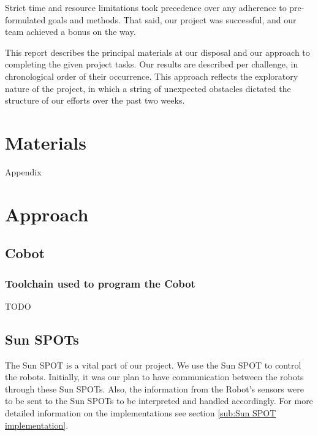 \documentclass[a4paper,10pt]{article} %
\begin{document}
Strict time and resource limitations took precedence over any adherence
to pre-formulated goals and methods. That said, our project was successful,
and our team achieved a bonus on the way.

This report describes the principal materials at our disposal and our approach
to completing the given project tasks. Our results are described per challenge,
in chronological order of their occurrence. This approach reflects the
exploratory nature of the project, in which a string of unexpected obstacles
dictated the structure of our efforts over the past two weeks.


\section{Materials} %

Appendix



\pagebreak

\section{Approach} %

\subsection{Cobot} %


\subsubsection{Toolchain used to program the Cobot} %
\label{ssub:Toolchain used to program the Cobot}

TODO


\vspace{5in}


\subsection{Sun SPOTs} %
\label{sec:sunspot}

The Sun SPOT is a vital part of our project. We use the Sun SPOT to control the
robots. Initially, it was our plan to have communication between the robots
through these Sun SPOTs. Also, the information from the Robot's sensors were to
be sent to the Sun SPOTs to be interpreted and handled accordingly. For more
detailed information on the implementations see section \ref{sub:Sun SPOT
implementation}.
\end{document}
